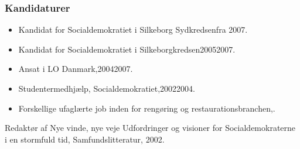 \documentclass[11pt, a4paper]{awesome-cv}
\begin{document}
\begin{cvletter}
\subsubsection*{Kandidaturer}
\begin{itemize}
\item Kandidat for Socialdemokratiet i Silkeborg Sydkredsenfra 2007.
\item Kandidat for Socialdemokratiet i Silkeborgkredsen20052007.
\end{itemize}
\begin{itemize}
\item Ansat i LO Danmark,20042007.
\item Studentermedhjælp, Socialdemokratiet,20022004.
\item Forskellige ufaglærte job inden for rengøring og restaurationsbranchen,.
\end{itemize}
Redaktør af Nye vinde, nye veje  Udfordringer og visioner for Socialdemokraterne i en stormfuld tid, Samfundslitteratur, 2002. 

\end{cvletter}
\end{document}
